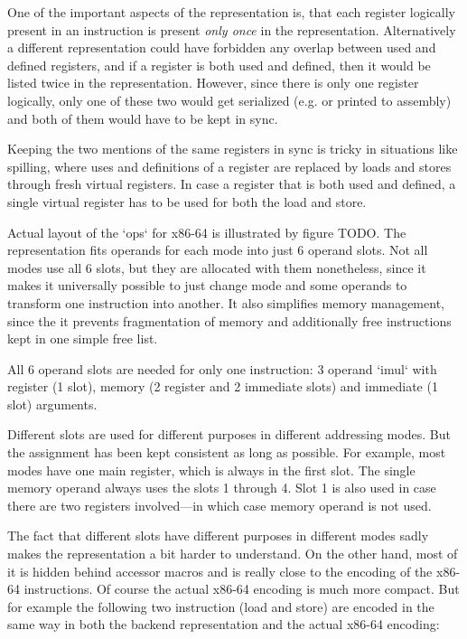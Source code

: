 One of the important aspects of the representation is, that each register
logically present in an instruction is present {\em only once} in the
representation. Alternatively a different representation could have forbidden
any overlap between used and defined registers, and if a register is both used
and defined, then it would be listed twice in the representation. However, since
there is only one register logically, only one of these two would get serialized
(e.g. or printed to assembly) and both of them would have to be kept in sync.

Keeping the two mentions of the same registers in sync is tricky in situations
like spilling, where uses and definitions of a register are replaced by loads
and stores through fresh virtual registers. In case a register that is both
used and defined, a single virtual register has to be used for both the load and
store.

Actual layout of the `ops` for x86-64 is illustrated by figure TODO. The
representation fits operands for each mode into just 6 operand slots. Not all modes
use all 6 slots, but they are allocated with them nonetheless, since it makes it
universally possible to just change mode and some operands to transform one
instruction into another. It also simplifies memory management, since the
it prevents fragmentation of memory and additionally free instructions kept in
one simple free list.

All 6 operand slots are needed for only one instruction: 3 operand `imul` with
register (1 slot), memory (2 register and 2 immediate slots) and immediate (1
slot) arguments.

Different slots are used for different purposes in different addressing modes.
But the assignment has been kept consistent as long as possible. For example,
most modes have one main register, which is always in the first slot. The single
memory operand always uses the slots 1 through 4. Slot 1 is also used in case
there are two registers involved---in which case memory operand is not used.

The fact that different slots have different purposes in different modes sadly
makes the representation a bit harder to understand. On the other hand, most of
it is hidden behind accessor macros and is really close to the encoding of the
x86-64 instructions. Of course the actual x86-64 encoding is much more compact.
But for example the following two instruction (load and store) are encoded in
the same way in both the backend representation and the actual x86-64 encoding:

